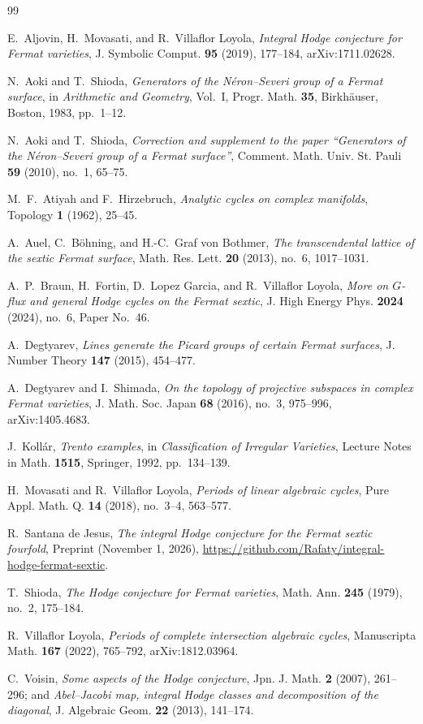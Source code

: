 \documentclass[11pt,a4paper]{amsart}
\theoremstyle{definition}
\begin{document}
\begin{thebibliography}{99}

E.~Aljovin, H.~Movasati, and R.~Villaflor Loyola,
\emph{Integral Hodge conjecture for Fermat varieties},
J. Symbolic Comput. \textbf{95} (2019), 177--184, arXiv:1711.02628.

N.~Aoki and T.~Shioda,
\emph{Generators of the N\'eron--Severi group of a Fermat surface},
in \emph{Arithmetic and Geometry}, Vol.~I, Progr. Math. \textbf{35}, Birkh\"auser, Boston, 1983, pp.~1--12.

N.~Aoki and T.~Shioda,
\emph{Correction and supplement to the paper ``Generators of the N\'eron--Severi group of a Fermat surface''},
Comment. Math. Univ. St. Pauli \textbf{59} (2010), no.~1, 65--75.

M.~F.~Atiyah and F.~Hirzebruch,
\emph{Analytic cycles on complex manifolds},
Topology \textbf{1} (1962), 25--45.

A.~Auel, C.~B\"ohning, and H.-C.~Graf von Bothmer,
\emph{The transcendental lattice of the sextic Fermat surface},
Math. Res. Lett. \textbf{20} (2013), no.~6, 1017--1031.

A.~P.~Braun, H.~Fortin, D.~Lopez Garcia, and R.~Villaflor Loyola,
\emph{More on $G$-flux and general Hodge cycles on the Fermat sextic},
J. High Energy Phys. \textbf{2024} (2024), no.~6, Paper No.~46.

A.~Degtyarev,
\emph{Lines generate the Picard groups of certain Fermat surfaces},
J. Number Theory \textbf{147} (2015), 454--477.

A.~Degtyarev and I.~Shimada,
\emph{On the topology of projective subspaces in complex Fermat varieties},
J. Math. Soc. Japan \textbf{68} (2016), no.~3, 975--996, arXiv:1405.4683.

J.~Koll\'ar,
\emph{Trento examples}, in \emph{Classification of Irregular Varieties},
Lecture Notes in Math. \textbf{1515}, Springer, 1992, pp.~134--139.

H.~Movasati and R.~Villaflor Loyola,
\emph{Periods of linear algebraic cycles},
Pure Appl. Math. Q. \textbf{14} (2018), no.~3--4, 563--577.

R.~Santana de Jesus,
\emph{The integral Hodge conjecture for the Fermat sextic fourfold},
Preprint (November 1, 2026), \url{https://github.com/Rafaty/integral-hodge-fermat-sextic}.

T.~Shioda,
\emph{The Hodge conjecture for Fermat varieties},
Math. Ann. \textbf{245} (1979), no.~2, 175--184.

R.~Villaflor Loyola,
\emph{Periods of complete intersection algebraic cycles},
Manuscripta Math. \textbf{167} (2022), 765--792, arXiv:1812.03964.

C.~Voisin,
\emph{Some aspects of the Hodge conjecture},
Jpn. J. Math. \textbf{2} (2007), 261--296; and \emph{Abel--Jacobi map, integral Hodge classes and decomposition of the diagonal}, J. Algebraic Geom. \textbf{22} (2013), 141--174.

\end{thebibliography}
\end{document}
